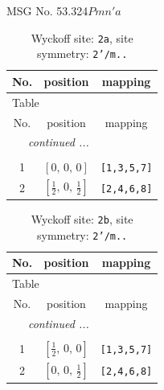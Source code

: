 \documentclass[fleqn,8pt]{jsarticle}
\begin{document}
\setcounter{MaxMatrixCols}{32}

\renewcommand{\tablename}{Table~}
\renewcommand{\figurename}{Figure~}
\begin{center}
\LARGE
MSG No. 53.324\quad$Pmn'a$
\end{center}
\renewcommand{\arraystretch}{1.2}
\begin{longtable}{ccc}
\caption{Wyckoff site: {\tt 2a}, site symmetry: {\tt 2'/m..}}
 \\
 \hline \hline
No. & position & mapping \\ \hline \endfirsthead

\multicolumn{2}{l}{\tablename\ \thetable{}} \\
 \hline \hline
No. & position & mapping \\ \hline \endhead

 \hline \hline
\multicolumn{2}{r}{\footnotesize\it continued ...} \\ \endfoot

 \hline \hline
\multicolumn{2}{r}{} \\ \endlastfoot

1 & $\left[ 0,\, 0,\, 0 \right]$ & {\tt [1,3,5,7]} \\ \hline
2 & $\left[ \frac{1}{2},\, 0,\, \frac{1}{2} \right]$ & {\tt [2,4,6,8]} \\
\end{longtable}
\renewcommand{\arraystretch}{1.2}
\begin{longtable}{ccc}
\caption{Wyckoff site: {\tt 2b}, site symmetry: {\tt 2'/m..}}
 \\
 \hline \hline
No. & position & mapping \\ \hline \endfirsthead

\multicolumn{2}{l}{\tablename\ \thetable{}} \\
 \hline \hline
No. & position & mapping \\ \hline \endhead

 \hline \hline
\multicolumn{2}{r}{\footnotesize\it continued ...} \\ \endfoot

 \hline \hline
\multicolumn{2}{r}{} \\ \endlastfoot

1 & $\left[ \frac{1}{2},\, 0,\, 0 \right]$ & {\tt [1,3,5,7]} \\ \hline
2 & $\left[ 0,\, 0,\, \frac{1}{2} \right]$ & {\tt [2,4,6,8]} \\
\end{longtable}
\renewcommand{\arraystretch}{1.2}
\end{document}
